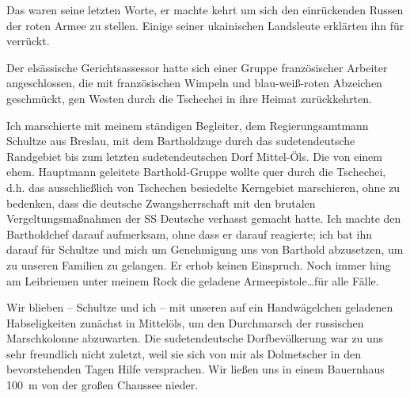 \documentclass[a5paper,pagesize,10pt,twoside=true]{scrbook}
\renewcommand{\marginpar}[2][]{}
\begin{document}
Das waren seine letzten Worte, er machte kehrt um sich den einrückenden Russen der roten Armee zu stellen. Einige seiner ukainischen Landsleute erklärten ihn für verrückt.

Der elsässische Gerichtsassessor hatte sich einer Gruppe französischer Arbeiter angeschlossen, die mit französischen Wimpeln und blau-weiß-roten Abzeichen geschmückt, gen Westen durch die Tschechei in ihre Heimat zurückkehrten.

Ich marschierte mit meinem ständigen Begleiter, dem Regierungsamtmann Schultze aus Breslau, mit dem Bartholdzuge durch das sudetendeutsche Randgebiet bis zum letzten sudetendeutschen Dorf Mittel-Öls. Die von einem ehem. Hauptmann geleitete \marginpar{70} Barthold-Gruppe wollte quer durch die Tschechei, d.h. das ausschließlich von Tschechen besiedelte Kerngebiet marschieren, ohne zu bedenken, dass die deutsche Zwangsherrschaft mit den brutalen Vergeltungsmaßnahmen der SS Deutsche verhasst gemacht hatte. Ich machte den Bartholdchef darauf aufmerksam, ohne dass er darauf reagierte; ich bat ihn darauf für Schultze und mich um Genehmigung uns von Barthold abzusetzen, um zu unseren Familien zu gelangen. Er erhob keinen Einspruch. Noch immer hing am Leibriemen unter meinem Rock die geladene Armeepistole\dots für alle Fälle.

Wir blieben -- Schultze und ich -- mit unseren auf ein Handwägelchen geladenen Habseligkeiten zunächst in Mittelöls, um den Durchmarsch der russischen Marschkolonne abzuwarten. Die sudetendeutsche Dorfbevölkerung war zu uns sehr freundlich nicht zuletzt, weil sie sich von mir als Dolmetscher in den bevorstehenden Tagen Hilfe versprachen. Wir ließen uns in einem Bauernhaus 100~m von der großen Chaussee nieder.
\end{document}
